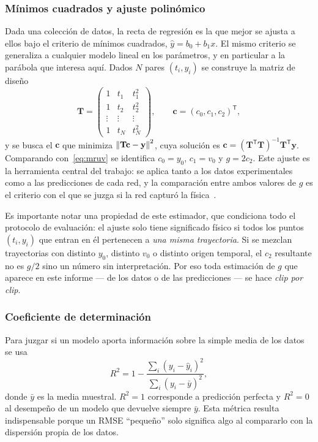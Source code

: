 \documentclass[titlepage,11pt]{article}
\begin{document}
\subsubsection{Mínimos cuadrados y ajuste polinómico}
\label{subsubsec:minimoscuadrados}
Dada una colección de datos, la recta de regresión es la que mejor se ajusta a
ellos bajo el criterio de mínimos cuadrados, $\hat y = b_0+b_1x$. El mismo
criterio se generaliza a cualquier modelo lineal en los parámetros, y en
particular a la parábola que interesa aquí. Dados $N$ pares $(t_i,y_i)$ se
construye la matriz de diseño
\begin{equation}
  \mathbf{T} =
  \begin{pmatrix}
    1 & t_1 & t_1^2\\
    1 & t_2 & t_2^2\\
    \vdots & \vdots & \vdots\\
    1 & t_N & t_N^2
  \end{pmatrix},
  \qquad
  \mathbf{c} = (c_0,c_1,c_2)^{\mathsf T},
\end{equation}
y se busca el $\mathbf{c}$ que minimiza $\norm{\mathbf{T}\mathbf{c}-\mathbf{y}}^2$,
cuya solución es $\mathbf{c}=(\mathbf{T}^{\mathsf T}\mathbf{T})^{-1}\mathbf{T}^{\mathsf T}\mathbf{y}$.
Comparando con~\eqref{eq:mruv} se identifica $c_0=y_0$, $c_1=v_0$ y
$g=2c_2$. Este ajuste es la herramienta central del trabajo: se aplica tanto a
los datos experimentales como a las predicciones de cada red, y la comparación
entre ambos valores de $g$ es el criterio con el que se juzga si la red capturó
la física~\cite{triola_2018_estadstica}.

Es importante notar una propiedad de este estimador, que condiciona todo el
protocolo de evaluación: el ajuste solo tiene significado físico si todos los
puntos $(t_i,y_i)$ que entran en él pertenecen a \emph{una misma trayectoria}.
Si se mezclan trayectorias con distinto $y_0$, distinto $v_0$ o distinto origen
temporal, el $c_2$ resultante no es $g/2$ sino un número sin interpretación.
Por eso toda estimación de $g$ que aparece en este informe --- de los datos o
de las predicciones --- se hace \emph{clip por clip}.

\subsubsection{Coeficiente de determinación}
Para juzgar si un modelo aporta información sobre la simple media de los datos
se usa
\begin{equation}
  R^2 = 1 - \frac{\sum_i (y_i-\hat y_i)^2}{\sum_i (y_i-\bar y)^2},
  \label{eq:r2}
\end{equation}
donde $\bar y$ es la media muestral. $R^2=1$ corresponde a predicción perfecta
y $R^2=0$ al desempeño de un modelo que devuelve siempre $\bar y$. Esta métrica
resulta indispensable porque un RMSE \enquote{pequeño} solo significa algo al
compararlo con la dispersión propia de los datos.
\end{document}

